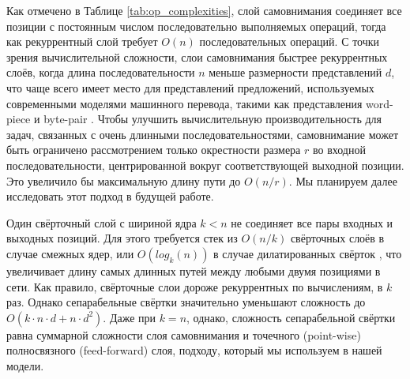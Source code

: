 \documentclass{article}
\begin{document}
Как отмечено в Таблице \ref{tab:op_complexities}, слой самовнимания соединяет все позиции с постоянным числом последовательно выполняемых операций, тогда как рекуррентный слой требует $O(n)$ последовательных операций.
С точки зрения вычислительной сложности, слои самовнимания быстрее рекуррентных слоёв, когда длина последовательности $n$ меньше размерности представлений $d$, что чаще всего имеет место для представлений предложений, используемых современными моделями машинного перевода, такими как представления word-piece \citep{wu2016google} и byte-pair \citep{sennrich2015neural}.
Чтобы улучшить вычислительную производительность для задач, связанных с очень длинными последовательностями, самовнимание может быть ограничено рассмотрением только окрестности размера $r$ во входной последовательности, центрированной вокруг соответствующей выходной позиции. Это увеличило бы максимальную длину пути до $O(n/r)$. Мы планируем далее исследовать этот подход в будущей работе.

Один свёрточный слой с шириной ядра $k < n$ не соединяет все пары входных и выходных позиций. Для этого требуется стек из $O(n/k)$ свёрточных слоёв в случае смежных ядер, или $O(log_k(n))$ в случае дилатированных свёрток \citep{NalBytenet2017}, что увеличивает длину самых длинных путей между любыми двумя позициями в сети.
Как правило, свёрточные слои дороже рекуррентных по вычислениям, в $k$ раз. Однако сепарабельные свёртки \citep{xception2016} значительно уменьшают сложность до $O(k \cdot n \cdot d + n \cdot d^2)$. Даже при $k=n$, однако, сложность сепарабельной свёртки равна суммарной сложности слоя самовнимания и точечного (point-wise) полносвязного (feed-forward) слоя, подходу, который мы используем в нашей модели.



\end{document}
